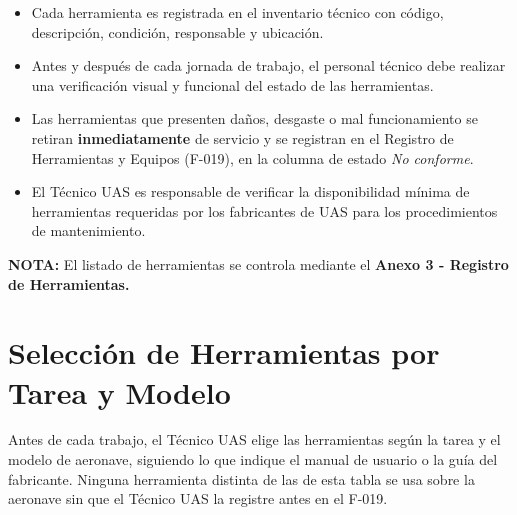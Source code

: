 \begin{itemize}
    \item Cada herramienta es registrada en el inventario técnico con código, descripción, condición, responsable y ubicación.

    \item Antes y después de cada jornada de trabajo, el personal técnico debe realizar una verificación visual y funcional del estado de las herramientas.

    \item Las herramientas que presenten daños, desgaste o mal funcionamiento se retiran \textbf{inmediatamente} de servicio y se registran en el Registro de Herramientas y Equipos (F-019), en la columna de estado \textit{No conforme}.

    \item El Técnico UAS es responsable de verificar la disponibilidad mínima de herramientas requeridas por los fabricantes de UAS para los procedimientos de mantenimiento.
\end{itemize}

\textbf{NOTA:} El listado de herramientas se controla mediante el \textbf{Anexo 3 - Registro de Herramientas.}




\section{Selección de Herramientas por Tarea y Modelo}
Antes de cada trabajo, el Técnico UAS elige las herramientas según la tarea y el modelo de aeronave, siguiendo lo que indique el manual de usuario o la guía del fabricante. Ninguna herramienta distinta de las de esta tabla se usa sobre la aeronave sin que el Técnico UAS la registre antes en el F-019.

